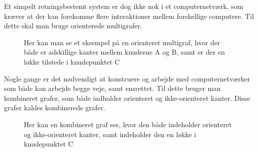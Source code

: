 \noindent Et simpelt retningsbestemt system er dog ikke nok i et computernetværk, som kræver at der kan forekomme flere interaktioner mellem forskellige computere. Til dette skal man bruge orienterede multigrafer.

\begin{figure}[h]
\centering
{}
\caption{Her kan man se et eksempel på en orienteret multigraf, hvor der både er adskillige kanter mellem knuderne A og B, samt er der en løkke tilstede i knudepunktet C }
\end{figure}

\noindent Nogle gange er det nødvendigt at konstruere og arbejde med computernetværker som både kan arbejde begge veje, samt ensrettet. Til dette bruger man kombineret grafer, som både indholder orienteret og ikke-orienteret kanter. Disse grafer kaldes kombinerede grafer.

\begin{figure}[!h]
\centering
{}
\caption{Her kan en kombineret graf ses, hvor den både indeholder orienteret og ikke-orienteret kanter, samt indeholder den en løkke i knudepunktet C}
\end{figure}


